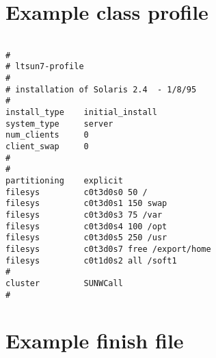 \newpage


\section{Example class profile}
\label{app:profile}

\begin{small}
\begin{verbatim}

#
# ltsun7-profile
#
# installation of Solaris 2.4  - 1/8/95
#
install_type    initial_install
system_type     server
num_clients     0
client_swap     0
#
#
partitioning    explicit
filesys         c0t3d0s0 50 /
filesys         c0t3d0s1 150 swap
filesys         c0t3d0s3 75 /var
filesys         c0t3d0s4 100 /opt
filesys         c0t3d0s5 250 /usr
filesys         c0t3d0s7 free /export/home
filesys         c0t1d0s2 all /soft1
#
cluster         SUNWCall
#

\end{verbatim}
\end{small}

\newpage

\section{Example finish file}
\label{app:finish}

